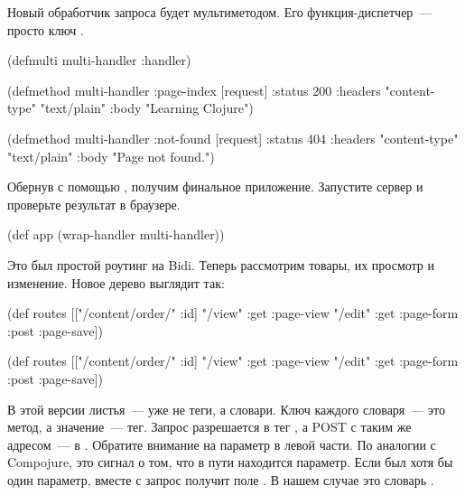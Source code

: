
Новый обработчик запроса будет мультиметодом. Его функ\-ция-дис\-пет\-чер~---
просто ключ .

\begin{clojure}
(defmulti multi-handler
  :handler)

(defmethod multi-handler :page-index
  [request]
  {:status 200
   :headers {"content-type" "text/plain"}
   :body "Learning Clojure"})

(defmethod multi-handler :not-found
  [request]
  {:status 404
   :headers {"content-type" "text/plain"}
   :body "Page not found."})
\end{clojure}

Обернув  с помощью , получим
финальное приложение. Запустите сервер и проверьте результат в браузере.

\begin{clojure}
(def app (wrap-handler multi-handler))
\end{clojure}

Это был простой роутинг на Bidi. Теперь рассмотрим товары, их
просмотр и изменение. Новое дерево выглядит так:

\ifnarrow

\begin{clojure}
(def routes
  [["/content/order/" :id]
   {"/view" {:get  :page-view}
    "/edit" {:get  :page-form
             :post :page-save}}])
\end{clojure}

\else

\begin{clojure}
(def routes
  [["/content/order/" :id] {"/view" {:get  :page-view}
                            "/edit" {:get  :page-form
                                     :post :page-save}}])
\end{clojure}

\fi

В этой версии листья~--- уже не теги, а словари. Ключ каждого
словаря~--- это метод, а значение~--- тег. Запрос 
разрешается в тег , а POST с таким же адресом~--- в
. Обратите внимание на параметр  в левой части. По
аналогии с Compojure, это сигнал о том, что в пути находится параметр. Если был
хотя бы один параметр, вместе с  запрос получит поле
. В нашем случае это словарь .

